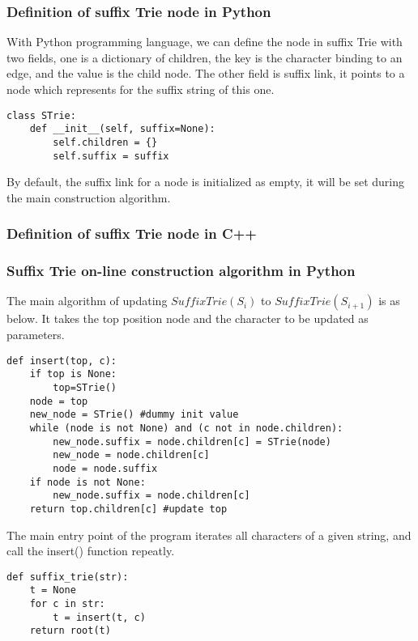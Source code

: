 \documentclass{article}
\begin{document}
\subsubsection*{Definition of suffix Trie node in Python}
With Python programming language, we can define the node in suffix Trie with two fields, one
is a dictionary of children, the key is the character binding to an edge, and the value
is the child node. The other field is suffix link, it points to a node which represents for
the suffix string of this one.

\lstset{language=Python}
\begin{lstlisting}
class STrie:
    def __init__(self, suffix=None):
        self.children = {}
        self.suffix = suffix
\end{lstlisting}

By default, the suffix link for a node is initialized as empty, it will be set during the 
main construction algorithm.

\subsubsection*{Definition of suffix Trie node in C++}

\subsubsection*{Suffix Trie on-line construction algorithm in Python}
The main algorithm of updating $SuffixTrie(S_i)$ to $SuffixTrie(S_{i+1})$ is as below.
It takes the top position node and the character to be updated as parameters.

\lstset{language=Python}
\begin{lstlisting}
def insert(top, c):
    if top is None:
        top=STrie()
    node = top
    new_node = STrie() #dummy init value
    while (node is not None) and (c not in node.children):
        new_node.suffix = node.children[c] = STrie(node)
        new_node = node.children[c]
        node = node.suffix
    if node is not None:
        new_node.suffix = node.children[c]
    return top.children[c] #update top
\end{lstlisting}

The main entry point of the program iterates all characters of a given string, and 
call the insert() function repeatly.

\begin{lstlisting}
def suffix_trie(str):
    t = None
    for c in str:
        t = insert(t, c)
    return root(t)
\end{lstlisting}
\end{document}
